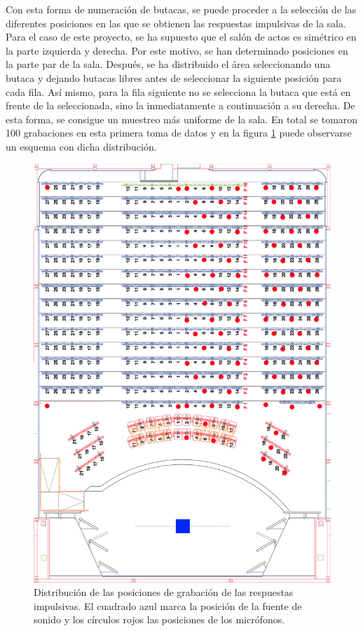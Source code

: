 \documentclass[11pt,a4paper,twoside]{book}
\begin{document}
		    Con esta forma de numeración de butacas, se puede proceder a la selección de las diferentes posiciones en las que se obtienen las respuestas impulsivas de la sala. Para el caso de este proyecto, se ha supuesto que el salón de actos es simétrico en la parte izquierda y derecha. Por este motivo, se han determinado posiciones en la parte par de la sala. Después, se ha distribuido el área seleccionando una butaca y dejando butacas libres antes de seleccionar la siguiente posición para cada fila. Así mismo, para la fila siguiente no se selecciona la butaca que está en frente de la seleccionada, sino la inmediatamente a continuación a su derecha. De esta forma, se consigue un muestreo más uniforme de la sala. En total se tomaron 100 grabaciones en esta primera toma de datos y en la figura \ref{fig:butacasMarcadas} puede observarse un esquema con dicha distribución. 
		
		    \begin{figure}
	            \includegraphics[scale=0.1]{../imagenes/auditorio_butacas_marcadas.png}
			    \centering
			    \caption{Distribución de las posiciones de grabación de las respuestas impulsivas. El cuadrado azul marca la posición de la fuente de sonido y los círculos rojos las posiciones de los micrófonos.}
			    \label{fig:butacasMarcadas}
	        \end{figure}
\end{document}
